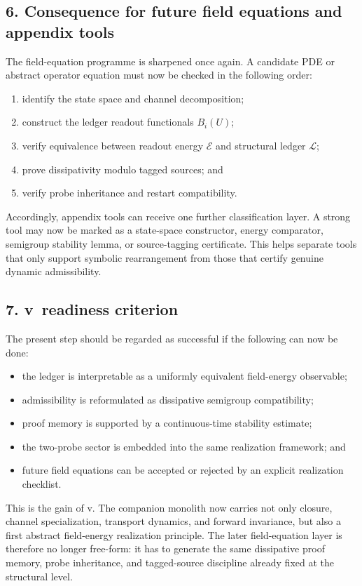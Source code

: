 \subsection*{6. Consequence for future field equations and appendix tools}
The field-equation programme is sharpened once again. A candidate PDE or abstract
operator equation must now be checked in the following order:
\begin{enumerate}[label=(\arabic*)]
  \item identify the state space and channel decomposition;
  \item construct the ledger readout functionals $B_i(U)$;
  \item verify equivalence between readout energy $\mathcal E$ and structural ledger $\mathcal L$;
  \item prove dissipativity modulo tagged sources; and
  \item verify probe inheritance and restart compatibility.
\end{enumerate}
Accordingly, appendix tools can receive one further classification layer. A strong
tool may now be marked as a state-space constructor, energy comparator, semigroup
stability lemma, or source-tagging certificate. This helps separate tools that only
support symbolic rearrangement from those that certify genuine dynamic admissibility.

\subsection*{7. v\docversion\ readiness criterion}
The present step should be regarded as successful if the following can now be done:
\begin{itemize}
  \item the ledger is interpretable as a uniformly equivalent field-energy observable;
  \item admissibility is reformulated as dissipative semigroup compatibility;
  \item proof memory is supported by a continuous-time stability estimate;
  \item the two-probe sector is embedded into the same realization framework; and
  \item future field equations can be accepted or rejected by an explicit realization checklist.
\end{itemize}

This is the gain of v\docversion. The companion monolith now carries not only
closure, channel specialization, transport dynamics, and forward invariance, but also
a first abstract field-energy realization principle. The later field-equation layer is
therefore no longer free-form: it has to generate the same dissipative proof memory,
probe inheritance, and tagged-source discipline already fixed at the structural level.


